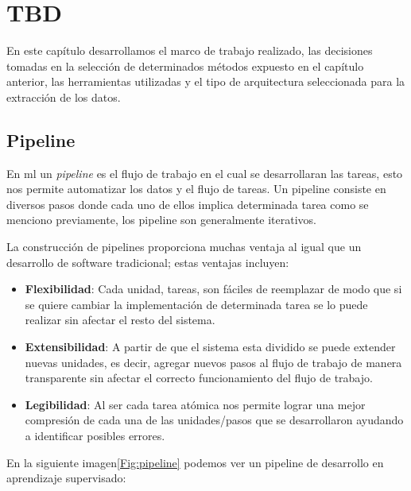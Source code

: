 \chapter{TBD}\label{ch:undefined}
En este capítulo desarrollamos el marco de trabajo realizado, las decisiones tomadas en la selección de determinados métodos expuesto en el capítulo anterior, las  herramientas utilizadas y el tipo de arquitectura seleccionada para la extracción de los datos.

\section{Pipeline}\label{sec: pipeline}
En \ac{ml} un \textit{pipeline} es el flujo de trabajo en el cual se desarrollaran las tareas, esto nos permite automatizar los datos y el flujo de tareas. Un pipeline consiste en diversos pasos donde cada uno de ellos implica determinada tarea como se menciono previamente, los pipeline son generalmente iterativos.

La construcción de pipelines proporciona muchas ventaja al igual que un desarrollo de software tradicional; estas ventajas incluyen:
\begin{itemize}
\item \textbf{Flexibilidad}: Cada unidad, tareas, son fáciles de reemplazar de modo que si se quiere cambiar la implementación de determinada tarea se lo puede realizar sin afectar el resto del sistema.

\item \textbf{Extensibilidad}: A partir de que el sistema esta dividido se puede extender nuevas unidades, es decir, agregar nuevos pasos al flujo de trabajo de manera transparente sin afectar el correcto funcionamiento del flujo de trabajo.

\item \textbf{Legibilidad}: Al ser cada tarea atómica nos permite lograr una mejor compresión de cada una de las unidades/pasos que se desarrollaron ayudando a identificar posibles errores.

\end{itemize}

En la siguiente imagen\ref{Fig:pipeline} podemos ver un pipeline de desarrollo en aprendizaje supervisado:

